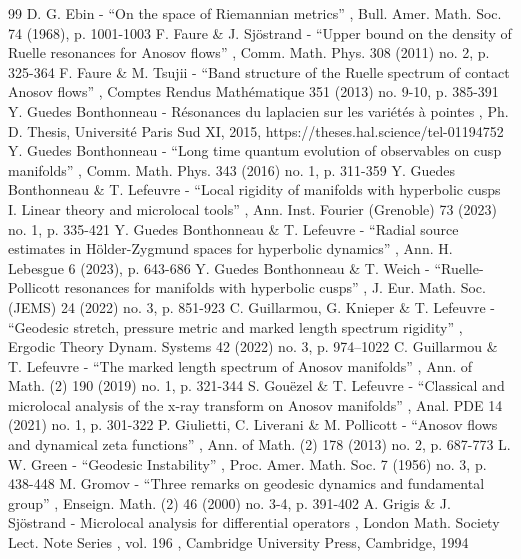 \documentclass[10pt]{amsart}
\theoremstyle{plain}
\theoremstyle{definition}
\begin{document}
\begin{thebibliography}{99}
 D. G. Ebin - “On the space of Riemannian metrics” , Bull. Amer. Math. Soc. 74 (1968), p. 1001-1003
 F. Faure \& J. Sjöstrand - “Upper bound on the density of Ruelle resonances for Anosov flows” , Comm. Math. Phys. 308 (2011) no. 2, p. 325-364
 F. Faure \& M. Tsujii - “Band structure of the Ruelle spectrum of contact Anosov flows” , Comptes Rendus Mathématique 351 (2013) no. 9-10, p. 385-391
 Y. Guedes Bonthonneau - Résonances du laplacien sur les variétés à pointes , Ph. D. Thesis, Université Paris Sud XI, 2015, https://theses.hal.science/tel-01194752
 Y. Guedes Bonthonneau - “Long time quantum evolution of observables on cusp manifolds” , Comm. Math. Phys. 343 (2016) no. 1, p. 311-359
 Y. Guedes Bonthonneau \& T. Lefeuvre - “Local rigidity of manifolds with hyperbolic cusps I. Linear theory and microlocal tools” , Ann. Inst. Fourier (Grenoble) 73 (2023) no. 1, p. 335-421
 Y. Guedes Bonthonneau \& T. Lefeuvre - “Radial source estimates in Hölder-Zygmund spaces for hyperbolic dynamics” , Ann. H. Lebesgue 6 (2023), p. 643-686
 Y. Guedes Bonthonneau \& T. Weich - “Ruelle-Pollicott resonances for manifolds with hyperbolic cusps” , J. Eur. Math. Soc. (JEMS) 24 (2022) no. 3, p. 851-923
 C. Guillarmou, G. Knieper \& T. Lefeuvre - “Geodesic stretch, pressure metric and marked length spectrum rigidity” , Ergodic Theory Dynam. Systems 42 (2022) no. 3, p. 974–1022
 C. Guillarmou \& T. Lefeuvre - “The marked length spectrum of Anosov manifolds” , Ann. of Math. (2) 190 (2019) no. 1, p. 321-344
 S. Gouëzel \& T. Lefeuvre - “Classical and microlocal analysis of the x-ray transform on Anosov manifolds” , Anal. PDE 14 (2021) no. 1, p. 301-322
 P. Giulietti, C. Liverani \& M. Pollicott - “Anosov flows and dynamical zeta functions” , Ann. of Math. (2) 178 (2013) no. 2, p. 687-773
 L. W. Green - “Geodesic Instability” , Proc. Amer. Math. Soc. 7 (1956) no. 3, p. 438-448
 M. Gromov - “Three remarks on geodesic dynamics and fundamental group” , Enseign. Math. (2) 46 (2000) no. 3-4, p. 391-402
 A. Grigis \& J. Sjöstrand - Microlocal analysis for differential operators , London Math. Society Lect. Note Series , vol. 196 , Cambridge University Press, Cambridge, 1994

\end{thebibliography}
\end{document}
